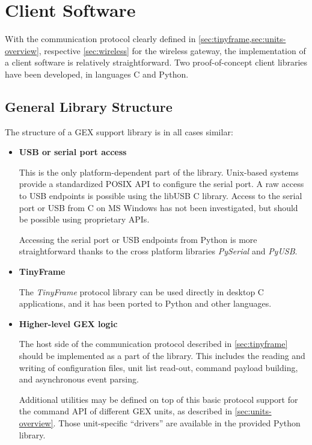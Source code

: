 \chapter{Client Software}

With the communication protocol clearly defined in \cref{sec:tinyframe,sec:units-overview}, respective \cref{sec:wireless} for the wireless gateway, the implementation of a client software is relatively straightforward. Two proof-of-concept client libraries have been developed, in languages C and Python.

\section{General Library Structure}

The structure of a GEX support library is in all cases similar:

\begin{itemize}
    \item \textbf{USB or serial port access}

        This is the only platform-dependent part of the library. Unix-based systems provide a standardized POSIX API to configure the serial port. A raw access to \gls{USB} endpoints is possible using the libUSB C library. Access to the serial port or \gls{USB} from C on MS Windows has not been investigated, but should be possible using proprietary APIs.

        Accessing the serial port or \gls{USB} endpoints from Python is more straightforward thanks to the cross platform libraries \textit{PySerial} and \textit{PyUSB}.

    \item \textbf{TinyFrame}

        The \textit{TinyFrame} protocol library can be used directly in desktop C applications, and it has been ported to Python and other languages.

    \item \textbf{Higher-level GEX logic}

        The host side of the communication protocol described in \cref{sec:tinyframe} should be implemented as a part of the library. This includes the reading and writing of configuration files, unit list read-out, command payload building, and asynchronous event parsing.

        Additional utilities may be defined on top of this basic protocol support for the command API of different GEX units, as described in \cref{sec:units-overview}. Those unit-specific ``drivers'' are available in the provided Python library.
\end{itemize}

